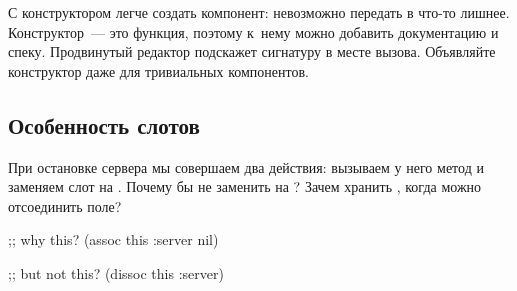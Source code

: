 \fi

С конструктором легче создать компонент: невозможно передать в
 что-то лишнее. Конструктор~--- это функция, поэтому к~нему
можно добавить документацию и спеку. Продвинутый редактор подскажет сигнатуру в
месте вызова. Объявляйте конструктор даже для тривиальных компонентов.

\subsection{Особенность слотов}

При остановке сервера мы совершаем два действия: вызываем у него метод
 и заменяем слот на . Почему бы не заменить
 на ? Зачем хранить , когда можно
отсоединить поле?

\ifnarrow

\begin{clojure}
;; why this?
(assoc this :server nil)

;; but not this?
(dissoc this :server)
\end{clojure}

\else

